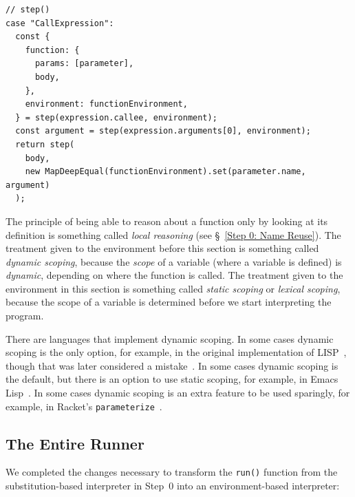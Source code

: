 \documentclass[12pt, oneside]{book}
\begin{document}
\begin{verbatim}
// step()
case "CallExpression":
  const {
    function: {
      params: [parameter],
      body,
    },
    environment: functionEnvironment,
  } = step(expression.callee, environment);
  const argument = step(expression.arguments[0], environment);
  return step(
    body,
    new MapDeepEqual(functionEnvironment).set(parameter.name, argument)
  );
\end{verbatim}

\begin{mdframed}[frametitle = {Technical Terms}]
The principle of being able to reason about a function only by looking at its definition is something called \emph{local reasoning} (see §~\ref{Step 0: Name Reuse}). The treatment given to the environment before this section is something called \emph{dynamic scoping}, because the \emph{scope} of a variable (where a variable is defined) is \emph{dynamic}, depending on where the function is called. The treatment given to the environment in this section is something called \emph{static scoping} or \emph{lexical scoping}, because the scope of a variable is determined before we start interpreting the program.
\end{mdframed}

\begin{mdframed}[frametitle = {Advanced}]
There are languages that implement dynamic scoping. In some cases dynamic scoping is the only option, for example, in the original implementation of LISP~\cite{lisp-original}, though that was later considered a mistake~\cite{lisp-history}. In some cases dynamic scoping is the default, but there is an option to use static scoping, for example, in Emacs Lisp~\cite[§~12.10]{emacs-lisp}. In some cases dynamic scoping is an extra feature to be used sparingly, for example, in Racket’s \texttt{parameterize}~\cite[§~4.13]{racket-guide}.
\end{mdframed}

\subsection{The Entire Runner}
\label{Step 1: The Entire Runner}

We completed the changes necessary to transform the \texttt{run()} function from the substitution-based interpreter in Step~0 into an environment-based interpreter:
\end{document}

